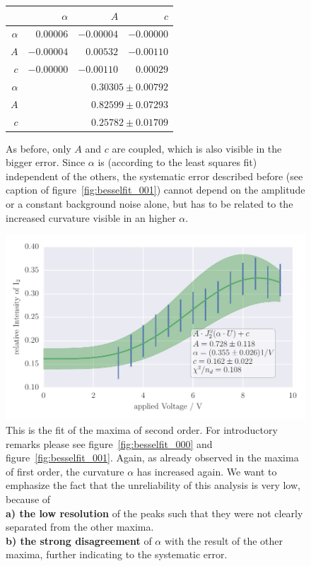 \begin{figure}
    \caption{
        As before, only $A$ and $c$ are coupled, which is also visible in the
        bigger error. Since $\alpha$ is (according to the least squares fit)
        independent of the others, the systematic error described before (see caption of figure~\ref{fig:besselfit_001}) 
        cannot depend on the amplitude or a constant background noise alone, 
        but has to be related to the increased curvature
        visible in an higher $\alpha$.}
    \begin{tabular}{|r|r|r|r|}
        \hline 
        \cellcolor{tabcolor}&\cellcolor{tabcolor}$\alpha$&\cellcolor{tabcolor}$A$&\cellcolor{tabcolor}$c$\\ \hline 
        \cellcolor{tabcolor}$\alpha$&$0.00006$ &$-0.00004$ &$-0.00000$ \\ 
        \cellcolor{tabcolor}$A$&$-0.00004$ &$0.00532$ &$-0.00110$ \\ 
        \cellcolor{tabcolor}$c$&$-0.00000$ &$-0.00110$ &$0.00029$ \\ \hline \hline
        \cellcolor{tabcolor}$\alpha$&\multicolumn{3}{r|}{$0.30305 \pm 0.00792$ }\\ 
        \cellcolor{tabcolor}$A$&\multicolumn{3}{r|}{$0.82599 \pm 0.07293$ }\\ 
        \cellcolor{tabcolor}$c$&\multicolumn{3}{r|}{$0.25782 \pm 0.01709$ }\\ 
        \hline
    \end{tabular}
\end{figure}
\newpage
\begin{figure}[htpb]
    \centering
    \includegraphics[width=1\textwidth]{analysis/figures/besselfit_002}
    \caption{This is the fit of the maxima of second order. For
    introductory remarks please see figure~\ref{fig:besselfit_000} and figure~\ref{fig:besselfit_001}.
    Again, as already observed in the maxima of first order, the curvature $\alpha$ has increased again.
    We want to emphasize the fact that the unreliability of this analysis is very low, because of \\
    \textbf{a) the low resolution} of the peaks such that they were not clearly separated 
    from the other maxima.\\
    \textbf{b) the strong disagreement} of $\alpha$ with the result of the other maxima, 
    further indicating to the systematic error.   
    }
    \label{fig:besselfit_002}
\end{figure}

